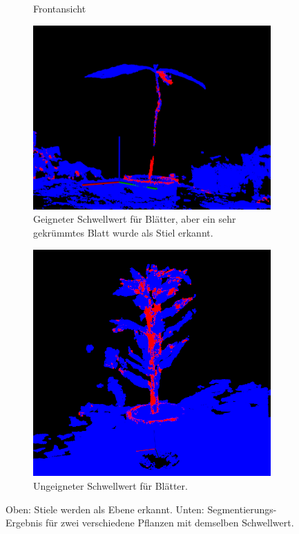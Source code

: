 \documentclass[12pt,titlepage, twoside]{article}
\begin{document}
\begin{figure}
\begin{subfigure}{0.45\textwidth}
  \caption{Frontansicht}
  \label{fig:handcrafted:classifier:odm:error:2}
\end{subfigure}
\medskip
\begin{subfigure}{0.45\textwidth}
  \includegraphics[width=\linewidth]{./Images/HandcraftedClassifierAvocado.png}
  \caption{Geigneter Schwellwert für Blätter, aber ein sehr gekrümmtes Blatt wurde als Stiel erkannt.}
  \label{fig:handcrafted:classifier:avocado}
\end{subfigure}\hfil 
\begin{subfigure}{0.45\textwidth}
  \includegraphics[width=\linewidth]{./Images/HandcraftedClassifierPlant2.png}
  \caption{Ungeigneter Schwellwert für Blätter.}
  \label{fig:handcrafted:classifier:plant2}
\end{subfigure}
\caption{Oben: Stiele werden als Ebene erkannt. Unten: Segmentierungs-Ergebnis für zwei verschiedene Pflanzen mit demselben Schwellwert.}
\label{fig:handcrafted:classifier}
\end{figure}
\end{document}
